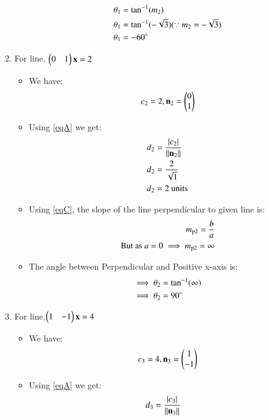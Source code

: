 \documentclass[journal,12pt,twocolumn]{IEEEtran}
\begin{document}
\begin{enumerate}
\begin{itemize}
 \begin{align}
  \theta\textsubscript{1} &= \tan^{-1}( m\textsubscript{2})
  \\
 \theta\textsubscript{1} &= \tan^{-1}(-\sqrt{3}) (\because m\textsubscript{2}=-\sqrt{3})
 \\
 \theta\textsubscript{1} &= -60\degree
\end{align}
\end{itemize}
\item For line, $\begin{pmatrix}0&1\end{pmatrix}\mathbf{x} =2$
\begin{itemize}
\item We have:
\begin{align}
 c\textsubscript{2}=2 ,{\mathbf{n\textsubscript{2}}}=\begin{pmatrix}0\\1\end{pmatrix}   
\end{align}
\item Using \eqref{eqA} we get:
\begin{align}
d\textsubscript{2}&=\frac { \left| c\textsubscript{2} \right| }{\lVert\mathbf{n\textsubscript{2}}\rVert}
\\
d\textsubscript{2}&=\frac{2}{\sqrt{1}} 
\\
d\textsubscript{2}&=2 \text{ units}
\end{align}
\item Using \eqref{eqC}, the slope of the line perpendicular to given line is:
\begin{align}
  m\textsubscript{p2}=\frac{b}{a}
  \\
\text{But as } a=0 \implies m\textsubscript{p2}=\infty
\end{align}
\item The angle between Perpendicular and Positive x-axis is:
 \begin{align}
 \implies \theta\textsubscript{2} &= \tan^{-1}(\infty)
  \\
 \implies \theta\textsubscript{2} &= 90\degree
\end{align}
\end{itemize}
\item For line,$\begin{pmatrix}1&-1\end{pmatrix}\mathbf{x} =4$
\begin{itemize}
\item We have:
\begin{align}
 c\textsubscript{3}=4 ,{\mathbf{n\textsubscript{3}}}=\begin{pmatrix}1\\-1\end{pmatrix}   
\end{align}
\item Using \eqref{eqA} we get:
\begin{align}
d\textsubscript{3}&=\frac { \left| c\textsubscript{3}\right| }{\norm{\vec{n\textsubscript{3}}}}

\end{align}
\end{itemize}
\end{enumerate}
\end{document}
